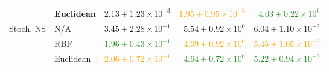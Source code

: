 \begin{table}[t]
{\begin{tabular}{llrrr}
 & Euclidean & $2.13 \pm 1.23 \times 10^{-3}$ & \textcolor{Orange}{\textbf{$1.95 \pm 0.95 \times 10^{-3}$}} & \textcolor{ForestGreen}{\textbf{$4.03 \pm 0.22 \times 10^{0}$}} \\
\midrule
\multirow{3}{*}{Stoch. NS}
 & N/A & $3.45 \pm 2.28 \times 10^{-1}$ & $5.54 \pm 0.92 \times 10^{0}$ & $6.04 \pm 1.10 \times 10^{-2}$ \\

 & RBF & \textcolor{ForestGreen}{\textbf{$1.96 \pm 0.43 \times 10^{-1}$}} & \textcolor{Orange}{\textbf{$4.69 \pm 0.92 \times 10^{0}$}} & \textcolor{Orange}{\textbf{$5.45 \pm 1.05 \times 10^{-2}$}} \\

 & Euclidean & \textcolor{Orange}{\textbf{$2.06 \pm 0.72 \times 10^{-1}$}} & \textcolor{ForestGreen}{\textbf{$4.64 \pm 0.72 \times 10^{0}$}} & \textcolor{ForestGreen}{\textbf{$5.22 \pm 0.94 \times 10^{-2}$}} \\
\bottomrule
\end{tabular}
} %
\end{table}